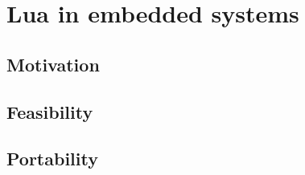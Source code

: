 \section{Lua in embedded systems}
\label{ch:lua_in_embedded}

\subsection{Motivation}


\subsection{Feasibility}


\subsection{Portability}